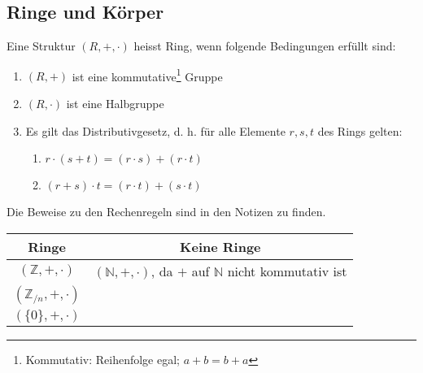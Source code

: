 \subsection{Ringe und Körper}
\begin{definition}
Eine Struktur $(R,+,\cdot)$ heisst Ring, wenn folgende Bedingungen erfüllt sind:
	\begin{enumerate}
		\item $(R, +)$ ist eine kommutative\footnote{Kommutativ: Reihenfolge egal; $a+b = b+a$} Gruppe
		\item $(R,\cdot)$ ist eine Halbgruppe
		\item Es gilt das Distributivgesetz, d. h. für alle Elemente $r,s,t$ des Rings gelten:
		\begin{enumerate}
			\item $r \cdot (s+t) = (r \cdot s) + (r \cdot t)$
			\item $(r+s) \cdot t = (r \cdot t) + (s \cdot t)$
		\end{enumerate}
	\end{enumerate}
\end{definition}
Die Beweise zu den Rechenregeln sind in den Notizen zu finden.
\begin{bsp}
\begin{tabular}{|c|c|}
\hline 
\rule[-1ex]{0pt}{2.5ex} Ringe & Keine Ringe \\ 
\hline 
\rule[-1ex]{0pt}{2.5ex} $(\mathbb{Z}, +, \cdot)$ & $(\mathbb{N}, +, \cdot)$, da $+$ auf $\mathbb{N}$ nicht kommutativ ist \\ 
\hline 
\rule[-1ex]{0pt}{2.5ex}  $(\mathbb{Z}_{/n}, +, \cdot)$ & \\ 
\hline 
\rule[-1ex]{0pt}{2.5ex}  $(\{0\}, +, \cdot)$ & \\ 
\hline 
\end{tabular} 
\end{bsp}

